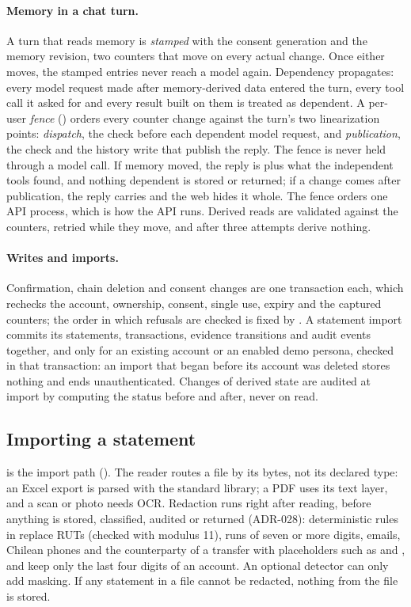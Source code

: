 \paragraph{Memory in a chat turn.} A turn that reads memory is \emph{stamped} with the consent generation and the memory
revision, two counters that move on every actual change. Once either moves, the stamped entries never reach a model
again. Dependency propagates: every model request made after memory-derived data entered the turn, every tool call it
asked for and every result built on them is treated as dependent. A per-user \emph{fence} () orders
every counter change against the turn's two linearization points: \emph{dispatch}, the check before each dependent model
request, and \emph{publication}, the check and the history write that publish the reply. The fence is never held
through a model call. If memory moved, the reply is  plus what the independent tools found, and
nothing dependent is stored or returned; if a change comes after publication, the reply carries
 and the web hides it whole. The fence orders one API process, which is how the API runs.
Derived reads are validated against the counters, retried while they move, and after three attempts derive nothing.

\paragraph{Writes and imports.} Confirmation, chain deletion and consent changes are one transaction each, which
rechecks the account, ownership, consent, single use, expiry and the captured counters; the order in which refusals are
checked is fixed by . A statement import commits its statements,
transactions, evidence transitions and audit events together, and only for an existing account or an enabled demo
persona, checked in that transaction: an import that began before its account was deleted stores nothing and ends
unauthenticated. Changes of derived state are audited at import by computing the status before and after, never on
read.

\subsection{Importing a statement}\label{sec:import}

 is the import path (). The reader routes a file by its
bytes, not its declared type: an Excel export is parsed with the standard library; a PDF uses its text layer, and a scan
or photo needs OCR. Redaction runs right after reading, before anything is stored, classified, audited or returned
(ADR-028): deterministic rules in  replace RUTs (checked with modulus 11), runs of
seven or more digits, emails, Chilean phones and the counterparty of a transfer with placeholders such as
\code{[PERSON]} and \code{[ID]}, and keep only the last four digits of an account. An optional detector can only add
masking. If any statement in a file cannot be redacted, nothing from the file is stored.


